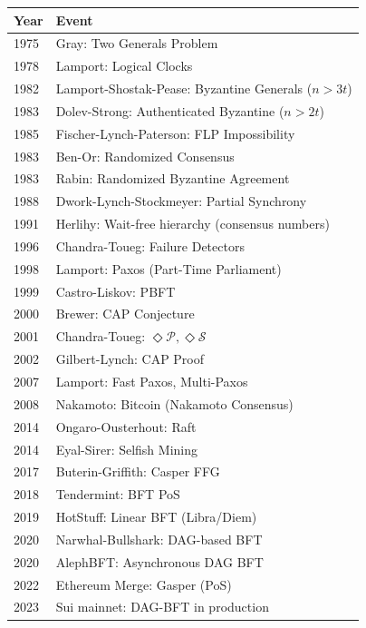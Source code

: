 \begin{tabularx}{\linewidth}{|l|X|}
\hline
\textbf{Year} & \textbf{Event} \\ \hline
1975 & Gray: Two Generals Problem \\ \hline
1978 & Lamport: Logical Clocks \\ \hline
1982 & Lamport-Shostak-Pease: Byzantine Generals ($n>3t$) \\ \hline
1983 & Dolev-Strong: Authenticated Byzantine ($n>2t$) \\
 \hline
1985 & Fischer-Lynch-Paterson: FLP Impossibility \\
 \hline
1983 & Ben-Or: Randomized Consensus \\
 \hline
1983 & Rabin: Randomized Byzantine Agreement \\
 \hline
1988 & Dwork-Lynch-Stockmeyer: Partial Synchrony \\
 \hline
1991 & Herlihy: Wait-free hierarchy (consensus numbers) \\
 \hline
1996 & Chandra-Toueg: Failure Detectors \\
 \hline
1998 & Lamport: Paxos (Part-Time Parliament) \\
 \hline
1999 & Castro-Liskov: PBFT \\
 \hline
2000 & Brewer: CAP Conjecture \\
 \hline
2001 & Chandra-Toueg: $\Diamond \mathcal{P}, \Diamond \mathcal{S}$ \\
 \hline
2002 & Gilbert-Lynch: CAP Proof \\
 \hline
2007 & Lamport: Fast Paxos, Multi-Paxos \\
 \hline
2008 & Nakamoto: Bitcoin (Nakamoto Consensus) \\
 \hline
2014 & Ongaro-Ousterhout: Raft \\
 \hline
2014 & Eyal-Sirer: Selfish Mining \\
 \hline
2017 & Buterin-Griffith: Casper FFG \\
 \hline
2018 & Tendermint: BFT PoS \\
 \hline
2019 & HotStuff: Linear BFT (Libra/Diem) \\
 \hline
2020 & Narwhal-Bullshark: DAG-based BFT \\
 \hline
2020 & AlephBFT: Asynchronous DAG BFT \\
 \hline
2022 & Ethereum Merge: Gasper (PoS) \\
 \hline
2023 & Sui mainnet: DAG-BFT in production \\
 \hline
\end{tabularx}

